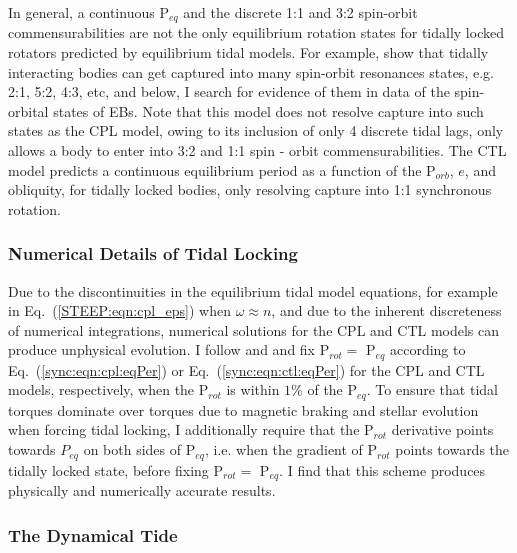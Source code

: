In general, a continuous P$_{eq}$ and the discrete 1:1 and 3:2 spin-orbit commensurabilities are not the only equilibrium rotation states for tidally locked rotators predicted by equilibrium tidal models. For example, \citet{Rodriguez2012} show that tidally interacting bodies can get captured into many spin-orbit resonances states, e.g. 2:1, 5:2, 4:3, etc, and below, I search for evidence of them in data of the spin-orbital states of \kepler EBs. Note that this model does not resolve capture into such states as the CPL model, owing to its inclusion of only 4 discrete tidal lags, only allows a body to enter into 3:2 and 1:1 spin - orbit commensurabilities. The CTL model predicts a continuous equilibrium period as a function of the P$_{orb}$, $e$, and obliquity, for tidally locked bodies, only resolving capture into 1:1 synchronous rotation.

\subsubsection{Numerical Details of Tidal Locking}

Due to the discontinuities in the equilibrium tidal model equations, for example in Eq.~(\ref{STEEP:eqn:cpl_eps}) when $\omega \approx n$, and due to the inherent discreteness of numerical integrations, numerical solutions for the CPL and CTL models can produce unphysical evolution. I follow \citet{Barnes2013} and \citet{Fleming2018} and fix P$_{rot} = $ P$_{eq}$ according to Eq.~(\ref{sync:eqn:cpl:eqPer}) or Eq.~(\ref{sync:eqn:ctl:eqPer}) for the CPL and CTL models, respectively, when the P$_{rot}$ is within $1\%$ of the P$_{eq}$.  To ensure that tidal torques dominate over torques due to magnetic braking and stellar evolution when forcing tidal locking, I additionally require that the P$_{rot}$ derivative points towards $P_{eq}$ on both sides of P$_{eq}$, i.e. when the gradient of P$_{rot}$ points towards the tidally locked state, before fixing P$_{rot} = $ P$_{eq}$. I find that this scheme produces physically and numerically accurate results. 

\subsubsection{The Dynamical Tide} \label{sync:sec:methods:dynamicalTide}

